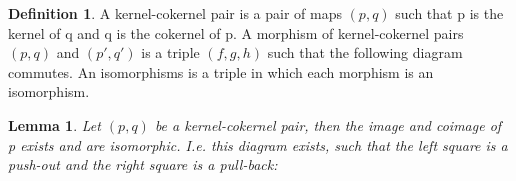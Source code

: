 \documentclass[12pt]{article}
\newtheorem{lemma}[theorem]{Lemma}
\theoremstyle{definition}
\newtheorem{definition}{Definition}[section]
\theoremstyle{remark}
\begin{document}
            \begin{definition}
                A kernel-cokernel pair is a pair of maps $(p,q)$ such that p is the kernel of q and q is the cokernel of p. A morphism of kernel-cokernel pairs $(p,q)$ and $(p',q')$ is a triple $(f,g,h)$ such that the following diagram commutes. An isomorphisms is a triple in which each morphism is an isomorphism.
                \begin{center}
                \end{center}
            \end{definition}

            \begin{lemma}
                Let $(p,q)$ be a kernel-cokernel pair, then the image and coimage of p exists and are isomorphic. I.e. this diagram exists, such that the left square is a push-out and the right square is a pull-back:
                \begin{center}
                \end{center}
            \end{lemma}
            
\end{document}
